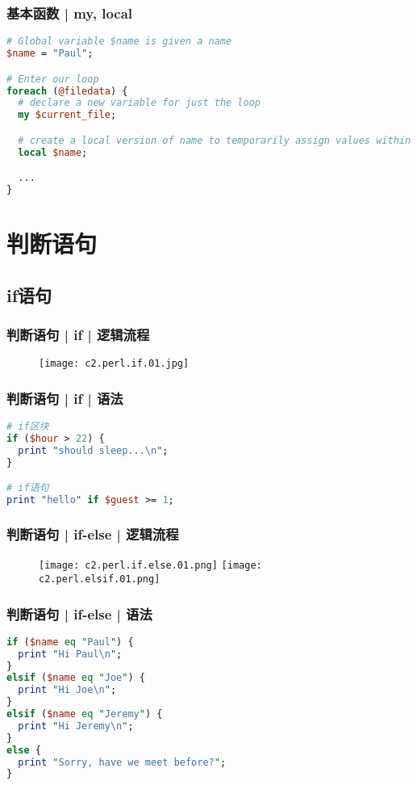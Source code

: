\begin{frame}[fragile]
  \frametitle{基本函数 | \alert{my}, local}
\begin{lstlisting}[language=Perl]
# Global variable $name is given a name
$name = "Paul";

# Enter our loop
foreach (@filedata) {
  # declare a new variable for just the loop
  my $current_file;

  # create a local version of name to temporarily assign values within the loop to
  local $name;

  ...
}
\end{lstlisting}
\end{frame}

\section{判断语句}
\subsection{if语句}
\begin{frame}
  \frametitle{判断语句 | if | 逻辑流程}
  \begin{figure}
    \centering
    \texttt{[image: c2.perl.if.01.jpg]}
  \end{figure}
\end{frame}

\begin{frame}[fragile]
  \frametitle{判断语句 | if | \alert{语法}}
\begin{lstlisting}[language=Perl]
# if区块
if ($hour > 22) {
  print "should sleep...\n";
}

# if语句
print "hello" if $guest >= 1;
\end{lstlisting}
\end{frame}

\begin{frame}
  \frametitle{判断语句 | if-else | 逻辑流程}
  \begin{figure}
    \centering
    \texttt{[image: c2.perl.if.else.01.png]}
    \texttt{[image: c2.perl.elsif.01.png]}
  \end{figure}
\end{frame}

\begin{frame}[fragile]
  \frametitle{判断语句 | if-else | \alert{语法}}
\begin{lstlisting}[language=Perl]
if ($name eq "Paul") {
  print "Hi Paul\n";
}
elsif ($name eq "Joe") {
  print "Hi Joe\n";
}
elsif ($name eq "Jeremy") {
  print "Hi Jeremy\n";
}
else {
  print "Sorry, have we meet before?";
}
\end{lstlisting}
\end{frame}


